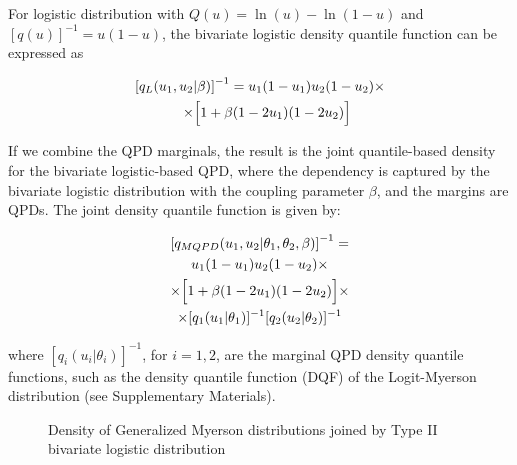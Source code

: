 \documentclass[
  fleqn,
  deca,
  blindrev
]{informs4}
\begin{document}
For logistic distribution with \(Q(u)=\ln(u)-\ln(1-u)\) and
\([q(u)]^{-1}=u(1-u)\), the bivariate logistic density quantile function
can be expressed as

\[
\begin{gathered}
\left[q_L(u_1,u_2\vert\beta)\right]^{-1}=u_1(1-u_1)u_2(1-u_2)\times\\
\quad\times \Bigl[1+\beta (1-2u_1)(1-2u_2)\Bigr]
\end{gathered}
\]

If we combine the QPD marginals, the result is the joint quantile-based
density for the bivariate logistic-based QPD, where the dependency is
captured by the bivariate logistic distribution with the coupling
parameter \(\beta\), and the margins are QPDs. The joint density
quantile function is given by:

\[
\begin{gathered}
\left[q_{MQPD}(u_1,u_2\vert\theta_1,\theta_2, \beta)\right]^{-1}=\\
u_1(1-u_1)u_2(1-u_2)\times\\
\times\Bigl[1+\beta (1-2u_1)(1-2u_2)\Bigr]\times\\
\times [q_1(u_1\vert\theta_1)]^{-1}[q_2(u_2\vert\theta_2)]^{-1}
\end{gathered}
\]

where \([q_i(u_i\vert\theta_i)]^{-1}\), for \(i=1,2\), are the marginal
QPD density quantile functions, such as the density quantile function
(DQF) of the Logit-Myerson distribution (see Supplementary Materials).

\begin{figure}


\caption{\label{fig-bi-logitmyerson}Density of Generalized Myerson
distributions joined by Type II bivariate logistic distribution}

\end{figure}%
\end{document}
